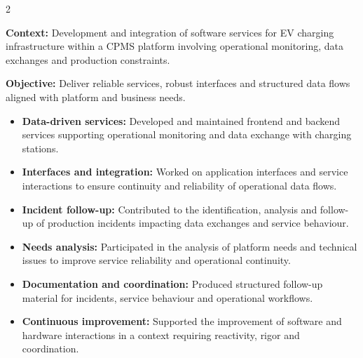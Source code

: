 \documentclass[8pt,a4paper,ragged2e,withhyper]{altacv}
\begin{document}


\makecvheader

\vspace{-0.3cm}


\begin{paracol}{2}


\textbf{Context:} Development and integration of software services for EV charging infrastructure within a CPMS platform involving operational monitoring, data exchanges and production constraints.

\textbf{Objective:} Deliver reliable services, robust interfaces and structured data flows aligned with platform and business needs.

\begin{itemize}
\item \textbf{Data-driven services:} Developed and maintained frontend and backend services supporting operational monitoring and data exchange with charging stations.
\item \textbf{Interfaces and integration:} Worked on application interfaces and service interactions to ensure continuity and reliability of operational data flows.
\item \textbf{Incident follow-up:} Contributed to the identification, analysis and follow-up of production incidents impacting data exchanges and service behaviour.
\item \textbf{Needs analysis:} Participated in the analysis of platform needs and technical issues to improve service reliability and operational continuity.
\item \textbf{Documentation and coordination:} Produced structured follow-up material for incidents, service behaviour and operational workflows.
\item \textbf{Continuous improvement:} Supported the improvement of software and hardware interactions in a context requiring reactivity, rigor and coordination.
\end{itemize}


\end{paracol}
\end{document}

